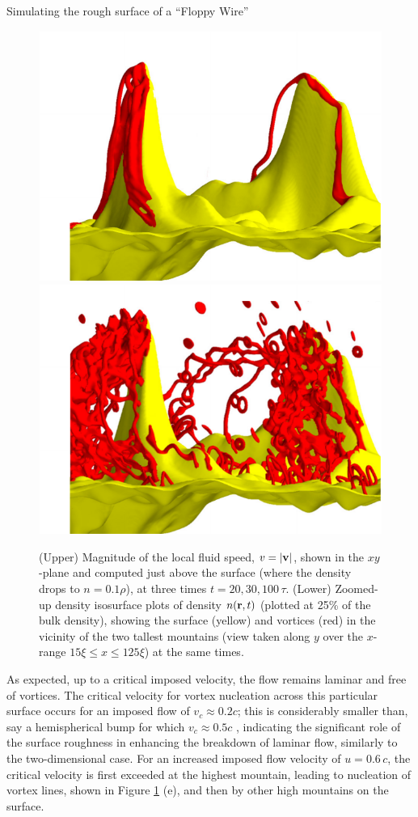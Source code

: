 \begin{chapter}{\label{cha:afm}Simulating the rough surface of a ``Floppy Wire''}
\begin{figure}
{\begin{minipage}{1.1\textwidth}
  \includegraphics[width=0.3\linewidth]{./afm/afm-sub-3101}
  \includegraphics[width=0.3\linewidth]{./afm/afm-sub-10101}
  \end{minipage}
  }
  \caption{\label{fig:velsandvorts}(Upper) Magnitude of the local fluid speed, $v=|{\bf v}|$, shown in the $xy$-plane and computed just above the surface (where the
density drops to $n=0.1 \rho$), at three times $t=20,30,100\,\tau$.  (Lower) Zoomed-up density isosurface plots of density $n({\bf r},t)$ (plotted at 25\%  of the bulk density), showing the surface (yellow) and vortices (red) in the vicinity of the two tallest mountains (view taken along $y$ over the $x$-range $15 \xi \leq x \leq 125 \xi$) at the same times.  %
}
 \end{figure} 

As expected, up to a critical imposed velocity, the flow remains laminar and free of vortices.  The critical velocity for vortex nucleation across this particular surface occurs for an imposed flow of $v_c\approx 0.2 c$; this is considerably smaller than, say a hemispherical bump for which $v_c \approx 0.5 c$ \cite{win01},  indicating the significant role of the surface roughness in enhancing the breakdown of laminar flow, similarly to the two-dimensional case. For an increased imposed flow velocity of $u=0.6\,c$, the critical velocity is first exceeded at the highest mountain, leading to nucleation of vortex lines, shown in Figure \ref{fig:velsandvorts} (e), and then by other high mountains on the surface.


\end{chapter}
